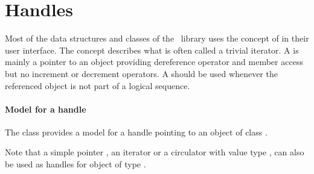 

\section{Handles} 



Most of the data structures and classes of the \cgal\ library
uses the concept of  in their user interface.
The concept  describes what is    often called 
a trivial iterator.  
A  is
mainly   a pointer to an object providing 
dereference operator  and 
member access  but no increment or decrement 
operators.
A   should be used whenever the referenced
object
is not part of a logical sequence.
 
\paragraph{Model for a handle}
The class 
provides a model for a handle
pointing to an object
of class . 

Note that a simple pointer ,
an iterator or a circulator with value type ,
can also be used as handles for object of type  .

